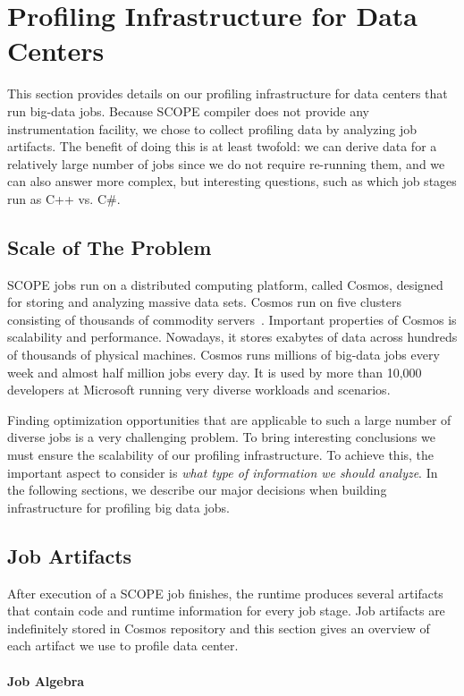 \section{Profiling Infrastructure for Data Centers}
This section provides details on our profiling infrastructure for data centers that run big-data jobs. Because SCOPE compiler does not provide any instrumentation facility, we chose to collect profiling data by analyzing job artifacts. The benefit of doing this is at least twofold: we can derive data for a relatively large number of jobs since we do not require re-running them, and we can also answer more complex, but interesting questions, such as which job stages run as C++ vs. C\#.

\subsection{Scale of The Problem}
SCOPE jobs run on a distributed computing platform, called Cosmos, designed for storing and analyzing massive data sets. Cosmos run on five clusters consisting of thousands of commodity servers~\cite{SCOPE}. Important properties of Cosmos is scalability and performance. Nowadays, it stores exabytes of data across hundreds of thousands of physical machines. Cosmos runs millions of big-data jobs every week and almost half million jobs every day. It is used by more than 10,000 developers at Microsoft running very diverse workloads and scenarios.

Finding optimization opportunities that are applicable to such a large number of diverse jobs is a very challenging problem. To bring interesting conclusions we must ensure the scalability of our profiling infrastructure. To achieve this, the important aspect to consider is \emph{what type of information we should analyze}. In the following sections, we describe our major decisions when building infrastructure for profiling big data jobs.

\subsection{Job Artifacts}

After execution of a SCOPE job finishes, the runtime produces several artifacts that contain code and runtime information for every job stage. Job artifacts are indefinitely stored in Cosmos repository and this section gives an overview of each artifact we use to profile data center.
\paragraph{Job Algebra}

